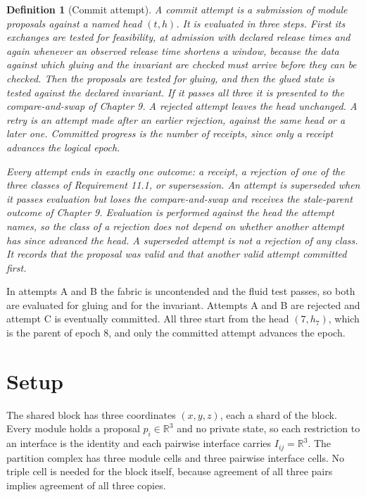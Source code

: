 \documentclass[11pt,openany]{book}
\newtheorem{definition}{Definition}[chapter]
\theoremstyle{remark}
\begin{document}
\begin{definition}[Commit attempt]
A commit attempt is a submission of module proposals against a named head $(t,h)$. It is evaluated in three steps. First its exchanges are tested for feasibility, at admission with declared release times and again whenever an observed release time shortens a window, because the data against which gluing and the invariant are checked must arrive before they can be checked. Then the proposals are tested for gluing, and then the glued state is tested against the declared invariant. If it passes all three it is presented to the compare-and-swap of Chapter 9. A rejected attempt leaves the head unchanged. A retry is an attempt made after an earlier rejection, against the same head or a later one. Committed progress is the number of receipts, since only a receipt advances the logical epoch.

Every attempt ends in exactly one outcome: a receipt, a rejection of one of the three classes of Requirement 11.1, or supersession. An attempt is superseded when it passes evaluation but loses the compare-and-swap and receives the stale-parent outcome of Chapter 9. Evaluation is performed against the head the attempt names, so the class of a rejection does not depend on whether another attempt has since advanced the head. A superseded attempt is not a rejection of any class. It records that the proposal was valid and that another valid attempt committed first.
\end{definition}

In attempts A and B the fabric is uncontended and the fluid test passes, so both are evaluated for gluing and for the invariant. Attempts A and B are rejected and attempt C is eventually committed. All three start from the head $(7,h_7)$, which is the parent of epoch $8$, and only the committed attempt advances the epoch.

\section{Setup}

The shared block has three coordinates $(x,y,z)$, each a shard of the block. Every module holds a proposal $p_i\in\mathbb R^3$ and no private state, so each restriction to an interface is the identity and each pairwise interface carries $I_{ij}=\mathbb R^3$. The partition complex has three module cells and three pairwise interface cells. No triple cell is needed for the block itself, because agreement of all three pairs implies agreement of all three copies.
\end{document}

